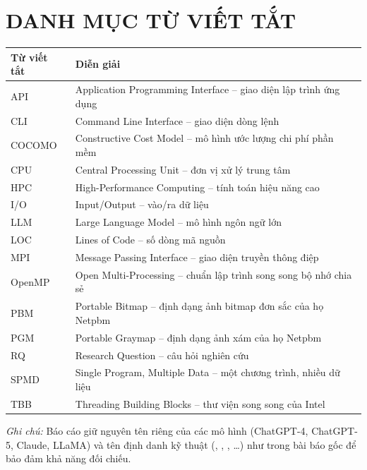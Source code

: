 \section*{DANH MỤC TỪ VIẾT TẮT}

\begin{center}
\small
\begin{tabularx}{0.92\textwidth}{@{}l X@{}}
\toprule
\textbf{Từ viết tắt} & \textbf{Diễn giải} \\
\midrule
API   & Application Programming Interface -- giao diện lập trình ứng dụng \\
CLI   & Command Line Interface -- giao diện dòng lệnh \\
COCOMO & Constructive Cost Model -- mô hình ước lượng chi phí phần mềm \\
CPU   & Central Processing Unit -- đơn vị xử lý trung tâm \\
HPC   & High-Performance Computing -- tính toán hiệu năng cao \\
I/O   & Input/Output -- vào/ra dữ liệu \\
LLM   & Large Language Model -- mô hình ngôn ngữ lớn \\
LOC   & Lines of Code -- số dòng mã nguồn \\
MPI   & Message Passing Interface -- giao diện truyền thông điệp \\
OpenMP & Open Multi-Processing -- chuẩn lập trình song song bộ nhớ chia sẻ \\
PBM   & Portable Bitmap -- định dạng ảnh bitmap đơn sắc của họ Netpbm \\
PGM   & Portable Graymap -- định dạng ảnh xám của họ Netpbm \\
RQ    & Research Question -- câu hỏi nghiên cứu \\
SPMD  & Single Program, Multiple Data -- một chương trình, nhiều dữ liệu \\
TBB   & Threading Building Blocks -- thư viện song song của Intel \\
\bottomrule
\end{tabularx}
\end{center}

\vspace{0.5cm}
\noindent\textit{Ghi chú:} Báo cáo giữ nguyên tên riêng của các mô hình
(ChatGPT-4, ChatGPT-5, Claude, LLaMA) và tên định danh kỹ thuật
(, , , \ldots)
như trong bài báo gốc để bảo đảm khả năng đối chiếu.
